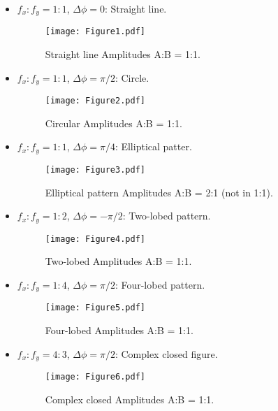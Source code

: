 \documentclass[a4paper,12pt]{article}
\begin{document}
\begin{itemize}
    \item $f_x:f_y = 1:1$, $\Delta \phi = 0$: Straight line.
    \begin{figure}[H]
    \centering
    \texttt{[image: Figure1.pdf]}
    \caption{Straight line Amplitudes A:B = 1:1.}
    \label{fig:StraightLine}
    \end{figure}

    \item $f_x:f_y = 1:1$, $\Delta \phi = \pi/2$: Circle.
    \begin{figure}[H]
    \centering
    \texttt{[image: Figure2.pdf]}
    \caption{Circular Amplitudes A:B = 1:1.}
    \label{fig:Circle}
    \end{figure}
		\vspace{100pt}

    \item $f_x:f_y = 1:1$, $\Delta \phi = \pi/4$: Elliptical patter.
    \begin{figure}[H]
    \centering
    \texttt{[image: Figure3.pdf]}
    \caption{Elliptical pattern Amplitudes A:B = 2:1 (not in 1:1).}
    \label{fig:Ellipse}
    \end{figure}

    \item $f_x:f_y = 1:2$, $\Delta \phi = -\pi/2$: Two-lobed pattern.
    \begin{figure}[H]
    \centering
    \texttt{[image: Figure4.pdf]}
    \caption{Two-lobed Amplitudes A:B = 1:1.}
    \label{fig:TwoLobed}
    \end{figure}

    \item $f_x:f_y = 1:4$, $\Delta \phi = \pi/2$: Four-lobed pattern.
    \begin{figure}[H]
    \centering
    \texttt{[image: Figure5.pdf]}
    \caption{Four-lobed Amplitudes A:B = 1:1.}
    \label{fig:FourLobed}
    \end{figure}
    \vspace{100pt}
    \item $f_x:f_y = 4:3$, $\Delta \phi = \pi/2$: Complex closed figure.
    \begin{figure}[H]
    \centering
    \texttt{[image: Figure6.pdf]}
    \caption{Complex closed Amplitudes A:B = 1:1.}
    \label{fig:Complex}
    \end{figure}
\end{itemize}
\end{document}
